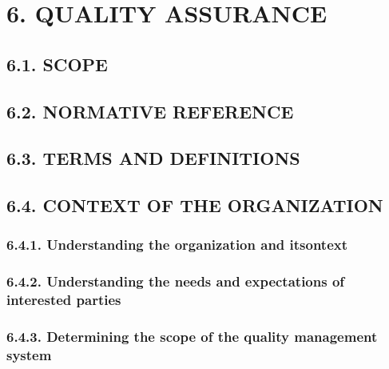\documentclass[
]{article}
\begin{document}
\hypertarget{quality-assurance}{%
\section{6. QUALITY ASSURANCE}\label{quality-assurance}}

\hypertarget{scope}{%
\subsection{6.1. SCOPE}\label{scope}}

\hypertarget{normative-reference}{%
\subsection{6.2. NORMATIVE REFERENCE}\label{normative-reference}}

\hypertarget{terms-and-definitions}{%
\subsection{6.3. TERMS AND DEFINITIONS}\label{terms-and-definitions}}

\hypertarget{context-of-the-organization}{%
\subsection{6.4. CONTEXT OF THE
ORGANIZATION}\label{context-of-the-organization}}

\hypertarget{understanding-the-organization-and-itsontext}{%
\subsubsection{6.4.1. Understanding the organization and
itsontext}\label{understanding-the-organization-and-itsontext}}

\hypertarget{understanding-the-needs-and-expectations-of-interested-parties}{%
\subsubsection{6.4.2. Understanding the needs and expectations of
interested
parties}\label{understanding-the-needs-and-expectations-of-interested-parties}}

\hypertarget{determining-the-scope-of-the-quality-management-system}{%
\subsubsection{6.4.3. Determining the scope of the quality management
system}\label{determining-the-scope-of-the-quality-management-system}}
\end{document}
